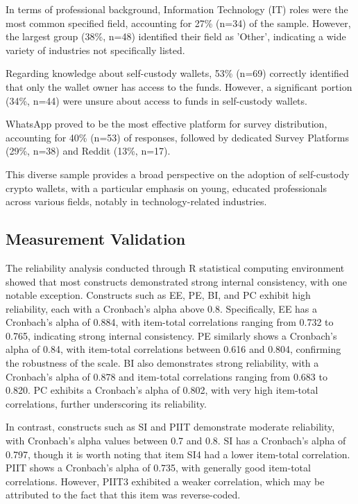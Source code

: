 \documentclass[twocolumn]{article}
\begin{document}
In terms of professional background, Information Technology (IT) roles were the most common specified field, accounting for 27\% (n=34) of the sample. However, the largest group (38\%, n=48) identified their field as 'Other', indicating a wide variety of industries not specifically listed.

Regarding knowledge about self-custody wallets, 53\% (n=69) correctly identified that only the wallet owner has access to the funds. However, a significant portion (34\%, n=44) were unsure about access to funds in self-custody wallets.

WhatsApp proved to be the most effective platform for survey distribution, accounting for 40\% (n=53) of responses, followed by dedicated Survey Platforms (29\%, n=38) and Reddit (13\%, n=17).

This diverse sample provides a broad perspective on the adoption of self-custody crypto wallets, with a particular emphasis on young, educated professionals across various fields, notably in technology-related industries.


\subsection{Measurement Validation}

The reliability analysis conducted through R statistical computing environment showed that most constructs demonstrated strong internal consistency, with one notable exception. Constructs such as EE, PE, BI, and PC exhibit high reliability, each with a Cronbach's alpha above 0.8. Specifically, EE has a Cronbach's alpha of 0.884, with item-total correlations ranging from 0.732 to 0.765, indicating strong internal consistency. PE similarly shows a Cronbach's alpha of 0.84, with item-total correlations between 0.616 and 0.804, confirming the robustness of the scale. BI also demonstrates strong reliability, with a Cronbach's alpha of 0.878 and item-total correlations ranging from 0.683 to 0.820. PC exhibits a Cronbach's alpha of 0.802, with very high item-total correlations, further underscoring its reliability.

In contrast, constructs such as SI and PIIT demonstrate moderate reliability, with Cronbach's alpha values between 0.7 and 0.8. SI has a Cronbach's alpha of 0.797, though it is worth noting that item SI4 had a lower item-total correlation. PIIT shows a Cronbach's alpha of 0.735, with generally good item-total correlations. However, PIIT3 exhibited a weaker correlation, which may be attributed to the fact that this item was reverse-coded. 
\end{document}
